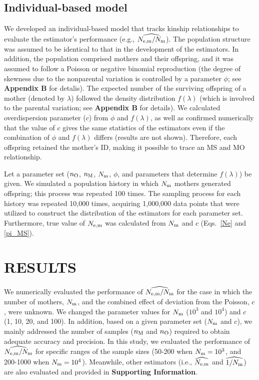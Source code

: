 \documentclass[12pt, English]{article}
\begin{document}
\begin{spacing}{1.9}
\subsection{Individual-based model}

We developed an individual-based model that tracks kinship relationships to evaluate the estimator's performance (e.g., $\widehat{N_{\rm e,m}/N_{\rm m}}$). The population structure was assumed to be identical to that in the development of the estimators. In addition, the population comprised mothers and their offspring, and it was assumed to follow a Poisson or negative binomial reproduction (the degree of skewness due to the nonparental variation is controlled by a parameter $\phi$; see {\bf Appendix B} for detalis). The expected number of the surviving offspring of a mother (denoted by $\lambda$) followed the density distribution $f(\lambda)$ (which is involved to the parental variation; see {\bf Appendix B} for details). We calculated overdispersion parameter ($c$) from $\phi$ and $f(\lambda)$, as well as confirmed numerically that the value of $c$ gives the same statistics of the estimators even if the combination of $\phi$ and $f(\lambda)$ differs (results are not shown). Therefore, each offspring retained the mother's ID, making it possible to trace an MS and MO relationship.

Let a parameter set ($n_{\rm O}$, $n_{\rm M}$, $N_{\rm m}$, $\phi$, and parameters that determine $f(\lambda)$) be given. We simulated a population history in which $N_{\rm m}$ mothers generated offspring; this process was repeated 100 times. The sampling process for each history was repeated 10{,}000 times, acquiring 1{,}000{,}000 data points that were utilized to construct the distribution of the estimators for each parameter set. Furthermore, true value of $N_{\rm e,m}$ was calculated from $N_{\rm m}$ and $c$ (Eqs.~\ref{Ne} and \ref{pi_MS}).

\section{RESULTS}

We numerically evaluated the performance of $\widehat{N_{\rm e,m}/N_{\rm m}}$ for the case in which the number of mothers, $N_{\rm m}$, and the combined effect of deviation from the Poisson, $c$, were unknown. We changed the parameter values for $N_{\rm m}$ ($10^3$ and $10^4$) and $c$ (1, 10, 20, and 100). In addition, based on a given parameter set ($N_{\rm m}$ and $c$), we mainly addressed the number of samples ($n_{\rm M}$ and $n_{\rm O}$) required to obtain adequate accuracy and precision. In this study, we evaluated the performance of $\widehat{N_{\rm e,m}/N_{\rm m}}$ for specific ranges of the sample sizes (50-200 when $N_{\rm m}=10^3$, and 200-1000 when $N_{\rm m}=10^4$). Meanwhile, other estimators (i.e., $\widehat{N_{\rm e,m}}$ and $\widehat{1/N_{\rm m}}$) are also evaluated and provided in {\bf Supporting Information}. 


\end{spacing}
\end{document}
